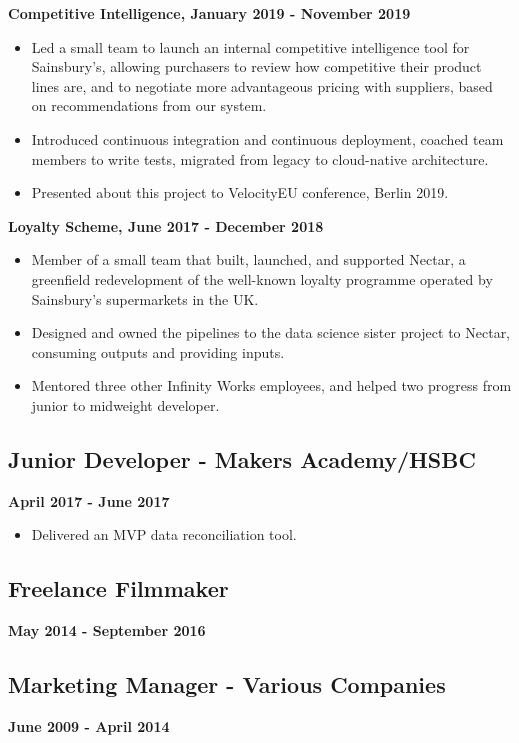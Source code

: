 \documentclass[a4paper]{scrartcl}
\begin{document}
\textbf{Competitive Intelligence, January 2019 - November 2019}
\begin{itemize}
      \item Led a small team to launch an internal competitive intelligence
            tool
            for Sainsbury's, allowing purchasers to review how competitive
            their
            product lines are, and to negotiate more advantageous pricing with
            suppliers,
            based on recommendations from our system.
      \item Introduced continuous integration and continuous deployment,
            coached
            team members to write tests, migrated from legacy to cloud-native
            architecture.
      \item Presented about this project to VelocityEU conference, Berlin 2019.
\end{itemize}

\textbf{Loyalty Scheme, June 2017 - December 2018}
\begin{itemize}
      \item Member of a small team that built, launched, and supported
            Nectar, a greenfield redevelopment of the well-known loyalty
            programme operated by Sainsbury's supermarkets in the UK.
      \item Designed and owned the pipelines to the data science sister project
            to Nectar, consuming outputs and providing inputs.
      \item Mentored three other Infinity Works employees, and helped two
            progress from junior to midweight developer.
\end{itemize}

\subsection*{Junior Developer - Makers Academy/HSBC}
\textbf{April 2017 - June 2017}
\begin{itemize}
      \item Delivered an MVP data reconciliation tool.
\end{itemize}

\subsection*{Freelance Filmmaker}
\textbf{May 2014 - September 2016}

\subsection*{Marketing Manager - Various Companies}
\textbf{June 2009 - April 2014}
\end{document}
